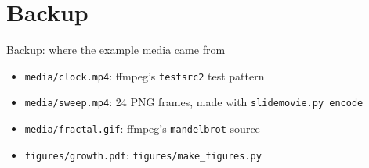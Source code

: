 \documentclass[aspectratio=169]{beamer}
\begin{document}
\appendix
\section*{Backup}

\begin{frame}[label=backup,noframenumbering]{Backup: where the example media came from}
	\begin{itemize}
		\item \texttt{media/clock.mp4}: ffmpeg's \texttt{testsrc2} test pattern
		\item \texttt{media/sweep.mp4}: 24 PNG frames, made with \texttt{slidemovie.py encode}
		\item \texttt{media/fractal.gif}: ffmpeg's \texttt{mandelbrot} source
		\item \texttt{figures/growth.pdf}: \texttt{figures/make\_figures.py}
	\end{itemize}
\end{frame}
\end{document}

